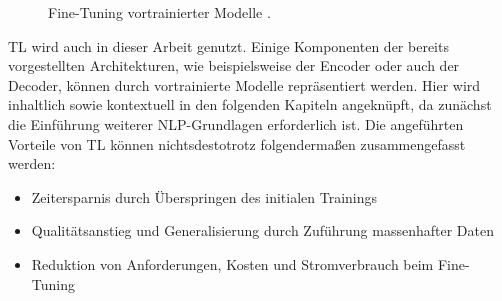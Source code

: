 \begin{figure}[h]
  \centering
  \caption{Fine-Tuning vortrainierter Modelle \cite[S.~555]{ZHA20}.}
  \label{pic:FineTuning}
\end{figure}
\newpage

\noindent
\ac{TL} wird auch in dieser Arbeit genutzt. Einige Komponenten der bereits vorgestellten Architekturen, wie beispielsweise der Encoder oder auch der Decoder, können durch vortrainierte Modelle repräsentiert werden. Hier wird inhaltlich sowie kontextuell in den folgenden Kapiteln angeknüpft, da zunächst die Einführung weiterer \ac{NLP}-Grundlagen erforderlich ist. Die angeführten Vorteile von \ac{TL} können nichtsdestotrotz folgendermaßen zusammengefasst werden:

\begin{itemize}
	\item Zeitersparnis durch Überspringen des initialen Trainings
	\item Qualitätsanstieg und Generalisierung durch Zuführung massenhafter Daten
	\item Reduktion von Anforderungen, Kosten und Stromverbrauch beim Fine-Tuning
\end{itemize}
